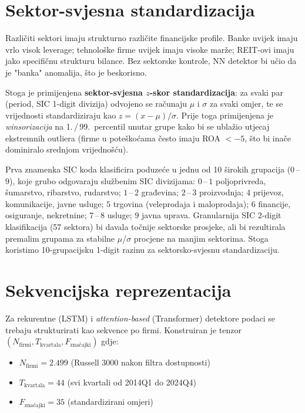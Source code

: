 \documentclass[diplomskirad,authoryear]{fer}
\begin{document}
\section{Sektor-svjesna standardizacija}

Različiti sektori imaju strukturno različite financijske profile. Banke uvijek imaju vrlo visok leverage; tehnološke firme uvijek imaju visoke marže; REIT-ovi imaju jako specifičnu strukturu bilance. Bez sektorske kontrole, NN detektor bi učio da je "banka" anomalija, što je beskorisno.

Stoga je primijenjena \textbf{sektor-svjesna $z$-skor standardizacija}: za svaki par (period, SIC 1-digit divizija) odvojeno se računaju $\mu$ i $\sigma$ za svaki omjer, te se vrijednosti standardiziraju kao $z = (x - \mu) / \sigma$. Prije toga primijenjena je \emph{winsorizacija} na 1.\,/\,99.\ percentil unutar grupe kako bi se ublažio utjecaj ekstremnih outliera (firme u poteškoćama često imaju ROA $< -5$, što bi inače dominiralo srednjom vrijednošću).

Prva znamenka SIC koda klasificira poduzeće u jednu od 10 širokih grupacija ($0$\,--\,$9$), koje grubo odgovaraju službenim SIC divizijama: $0$\,--\,$1$ poljoprivreda, šumarstvo, ribarstvo, rudarstvo; $1$\,--\,$2$ građevina; $2$\,--\,$3$ proizvodnja; $4$ prijevoz, komunikacije, javne usluge; $5$ trgovina (veleprodaja i maloprodaja); $6$ financije, osiguranje, nekretnine; $7$\,--\,$8$ usluge; $9$ javna uprava. Granularnija SIC 2-digit klasifikacija (57 sektora) bi davala točnije sektorske prosjeke, ali bi rezultirala premalim grupama za stabilne $\mu$/$\sigma$ procjene na manjim sektorima. Stoga koristimo 10-grupacijsku 1-digit razinu za sektorsko-svjesnu standardizaciju.

\section{Sekvencijska reprezentacija}

Za rekurentne (LSTM) i \emph{attention-based} (Transformer) detektore podaci se trebaju strukturirati kao sekvence po firmi. Konstruiran je tenzor $(N_{\text{firmi}}, T_{\text{kvartala}}, F_{\text{značajki}})$ gdje:
\begin{itemize}
 \item $N_{\text{firmi}} = 2.499$ (Russell 3000 nakon filtra dostupnosti)
 \item $T_{\text{kvartala}} = 44$ (svi kvartali od 2014Q1 do 2024Q4)
 \item $F_{\text{značajki}} = 35$ (standardizirani omjeri)
\end{itemize}
\end{document}
